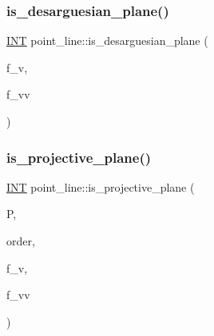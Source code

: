 \mbox{\label{classpoint__line_a664189dde33698267c4c82b1ee3aa401}} 
\subsubsection{\texorpdfstring{is\+\_\+desarguesian\+\_\+plane()}{is\_desarguesian\_plane()}}
{\footnotesize\ttfamily \mbox{\hyperlink{galois_8h_a09fddde158a3a20bd2dcadb609de11dc}{I\+NT}} point\+\_\+line\+::is\+\_\+desarguesian\+\_\+plane (\begin{DoxyParamCaption}\item[{\mbox{\hyperlink{galois_8h_a09fddde158a3a20bd2dcadb609de11dc}{I\+NT}}}]{f\+\_\+v,  }\item[{\mbox{\hyperlink{galois_8h_a09fddde158a3a20bd2dcadb609de11dc}{I\+NT}}}]{f\+\_\+vv }\end{DoxyParamCaption})}

\mbox{\label{classpoint__line_a9119e95354478c77512dd1b02e2e7d7e}} 
\subsubsection{\texorpdfstring{is\+\_\+projective\+\_\+plane()}{is\_projective\_plane()}}
{\footnotesize\ttfamily \mbox{\hyperlink{galois_8h_a09fddde158a3a20bd2dcadb609de11dc}{I\+NT}} point\+\_\+line\+::is\+\_\+projective\+\_\+plane (\begin{DoxyParamCaption}\item[{\mbox{\hyperlink{classpartitionstack}{partitionstack}} \&}]{P,  }\item[{\mbox{\hyperlink{galois_8h_a09fddde158a3a20bd2dcadb609de11dc}{I\+NT}} \&}]{order,  }\item[{\mbox{\hyperlink{galois_8h_a09fddde158a3a20bd2dcadb609de11dc}{I\+NT}}}]{f\+\_\+v,  }\item[{\mbox{\hyperlink{galois_8h_a09fddde158a3a20bd2dcadb609de11dc}{I\+NT}}}]{f\+\_\+vv }\end{DoxyParamCaption})}

\mbox{\label{classpoint__line_a86d6a058b994f296c769ff01c985af2d}} 
